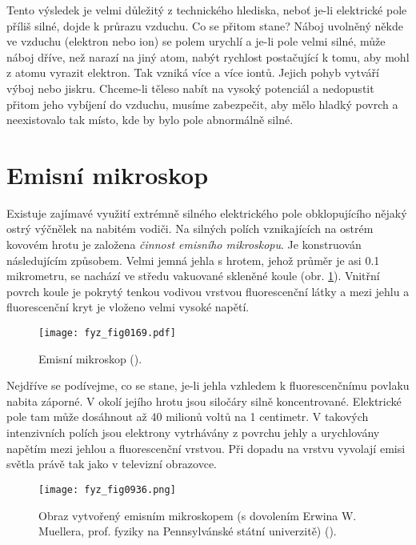   Tento výsledek je velmi důležitý z technického hlediska, neboť je-li elektrické pole příliš silné,
  dojde k průrazu vzduchu. Co se přitom stane? Náboj uvolněný někde ve vzduchu (elektron nebo ion)
  se polem urychlí a je-li pole velmi silné, může náboj dříve, než narazí na jiný atom, nabýt
  rychlost postačující k tomu, aby mohl z atomu vyrazit elektron. Tak vzniká více a více iontů.
  Jejich pohyb vytváří výboj nebo jiskru. Chceme-li těleso nabít na vysoký potenciál a nedopustit
  přitom jeho vybíjení do vzduchu, musíme zabezpečit, aby mělo hladký povrch a neexistovalo tak
  místo, kde by bylo pole abnormálně silné.
  
\section{Emisní mikroskop}\label{fyz:IIchapVsecXXI}  
  Existuje zajímavé využití extrémně silného elektrického pole obklopujícího nějaký ostrý výčnělek
  na nabitém vodiči. Na silných polích vznikajících na ostrém kovovém hrotu je založena
  \emph{činnost emisního mikroskopu}. Je konstruován následujícím způsobem. Velmi jemná jehla s
  hrotem, jehož průměr je asi \num{0.1} mikrometru, se nachází ve středu vakuované skleněné koule
  (obr. \ref{fyz:fig0169}). Vnitřní povrch koule je pokrytý tenkou vodivou vrstvou fluorescenční
  látky a mezi jehlu a fluorescenční kryt je vloženo velmi vysoké napětí.

  \begin{figure}[ht!]  %
    \centering
    \texttt{[image: fyz\_fig0169.pdf]}
    \caption{Emisní mikroskop (\cite[s.~118]{Feynman02}).}
    \label{fyz:fig0169}
  \end{figure}

  Nejdříve se podívejme, co se stane, je-li jehla vzhledem k fluorescenčnímu povlaku nabita záporné.
  V okolí jejího hrotu jsou siločáry silně koncentrované. Elektrické pole tam může dosáhnout až 40
  milionů voltů na 1 centimetr. V takových intenzivních polích jsou elektrony vytrhávány z povrchu
  jehly a urychlovány napětím mezi jehlou a fluorescenční vrstvou. Při dopadu na vrstvu vyvolají
  emisi světla právě tak jako v televizní obrazovce.

  \begin{figure}[ht!]  %
    \centering
    \texttt{[image: fyz\_fig0936.png]}
    \caption{Obraz vytvořený emisním mikroskopem (s dovolením Erwina W. Muellera, prof. fyziky na 
            Pennsylvánské státní univerzitě) (\cite[s.~119]{Feynman02}).}
    \label{fyz:fig0936}
  \end{figure}

